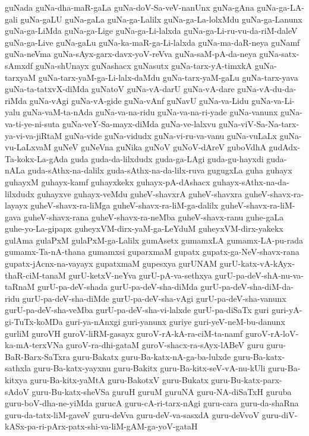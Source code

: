 {guNada
guNa-dha-maR-gaLa
guNa-doV-Sa-veV-nanUnx
guNa-gAna
guNa-ga-LA-gali
guNa-gaLU
guNa-gaLa
guNa-ga-Lalilx
guNa-ga-La-lolxMdu
guNa-ga-Lanunx
guNa-ga-LiMda
guNa-ga-Lige
guNa-ga-Li-lalxda
guNa-ga-Li-ru-vu-da-riM-daleV
guNa-ga-Live
guNa-gaLu
guNa-ka-maR-ga-Li-lalxda
guNa-ma-daR-neya
guNamf
guNa-neVma
guNa-sAyx-garx-davx-yoV-reVva
guNa-saM-pA-da-neya
guNa-satx-sAmxdf
guNa-shUnayx
guNashacx
guNasutx
guNa-tarx-yA-timxkA
guNa-tarxyaM
guNa-tarx-yaM-ga-Li-lalx-daMdu
guNa-tarx-yaM-gaLu
guNa-tarx-yava
guNa-ta-tatxvX-diMda
guNatoV
guNa-vA-darU
guNa-vA-dare
guNa-vA-du-da-riMda
guNa-vAgi
guNa-vA-gide
guNa-vAnf
guNavU
guNa-va-Lidu
guNa-va-Li-yalu
guNa-vaM-ta-nAda
guNa-va-na-ridu
guNa-va-na-ri-yade
guNa-vanunx
guNa-va-ti-ye-ni-suta
guNa-veY-Sa-mayx-diMda
guNa-ve-lalxvu
guNa-viV-Sa-Na-tarx-ya-vi-va-jiRtaM
guNa-vide
guNa-vidudx
guNa-vi-ru-va-vanu
guNa-vuLaLx
guNa-vu-LaLxvaM
guNeV
guNeVna
guNika
guNoV
guNoV-dAreV
guboVdhA
gudAdx-Ta-kokx-La-gAda
guda
guda-da-lilxdudx
guda-ga-LAgi
guda-gu-hayxdi
guda-nALa
guda-sAthx-na-dalilx
guda-sAthx-na-da-lilx-ruva
gugugxLa
guha
guhayx
guhayxM
guhayx-kamf
guhayxkekx
guhayx-pA-dAshacx
guhayx-sAthx-na-da-lilxdudx
guhayxve
guhayx-veMdu
guheV-shavxrA
guheV-shavxra
guheV-shavx-ra-layayx
guheV-shavx-ra-liMga
guheV-shavx-ra-liM-ga-dalilx
guheV-shavx-ra-liM-gava
guheV-shavx-rana
guheV-shavx-ra-neMba
guheV-shavx-ranu
guhe-gaLa
guhe-yo-La-gipapx
guheyxVM-dirx-yaM-ga-LeYduM
guheyxVM-dirx-yakekx
gulAma
gulaPxM
gulaPxM-ga-Lalilx
gumAsetx
gumamxLA
gumamx-LA-pu-rada
gumamx-Ta-nA-thana
gumamxsi
guparxmaM
gupatx
gupatx-ga-NeV-shavx-rana
gupatx-jAcnx-na-vayayx
gupatxmaM
gupesxya
gurUNAM
gurU-katx-vA-kAyx-thaR-ciM-tanaM
gurU-ketxV-neYva
gurU-pA-va-sethxya
gurU-pa-deV-shA-nu-va-taRnaM
gurU-pa-deV-shada
gurU-pa-deV-sha-diMda
gurU-pa-deV-sha-diM-da-ridu
gurU-pa-deV-sha-diMde
gurU-pa-deV-sha-vAgi
gurU-pa-deV-sha-vanunx
gurU-pa-deV-sha-veMba
gurU-pa-deV-sha-vi-lalxde
gurU-pa-diSaTx
guri
guri-yA-gi-TuTx-koMDa
guri-ya-nAnxgi
guri-yanunx
guriye
guri-yeV-neM-bu-danunx
gurliM
guroVH
guroV-liRM-gasayx
guroV-rA-kA-ra-ciM-ta-namf
guroV-rA-loV-ka-mA-terxVNa
guroV-ra-dhi-gataM
guroV-shacx-ra-sAyx-lABeV
guru
guru-BaR-Barx-SaTxra
guru-Bakatx
guru-Ba-katx-nA-ga-ba-lulxde
guru-Ba-katx-sathxla
guru-Ba-katx-yayxnu
guru-Bakitx
guru-Ba-kitx-seV-vA-nu-kUli
guru-Ba-kitxya
guru-Ba-kitx-yaMtA
guru-BakotxV
guru-Bukatx
guru-Bu-katx-parx-sAdoV
guru-Bu-katx-sheVSa
guruH
guruM
guruNA
guru-NA-diSaTxH
guruba
guru-boV-dha-ne-yiMda
gurucA
guru-cA-ri-tarx-nAgi
guru-cara
guru-da-shaRna
guru-da-tatx-liM-gaveV
guru-deVva
guru-deV-va-sasxdA
guru-deVvoV
guru-diV-kASx-pa-ri-pArx-patx-shi-va-liM-gAM-ga-yoV-gataH
}
